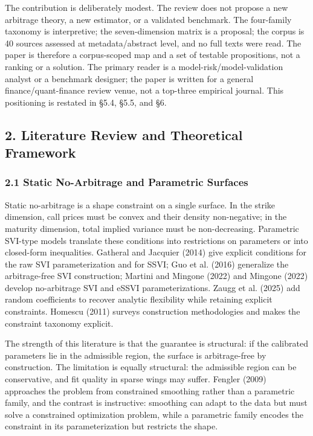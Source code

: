 \documentclass[11pt]{article}
\begin{document}
The contribution is deliberately modest. The review does not propose a new arbitrage theory, a new estimator, or a validated benchmark. The four-family taxonomy is interpretive; the seven-dimension matrix is a proposal; the corpus is 40 sources assessed at metadata/abstract level, and no full texts were read. The paper is therefore a corpus-scoped map and a set of testable propositions, not a ranking or a solution. The primary reader is a model-risk/model-validation analyst or a benchmark designer; the paper is written for a general finance/quant-finance review venue, not a top-three empirical journal. This positioning is restated in \S 5.4, \S 5.5, and \S 6.

\subsection*{2. Literature Review and Theoretical Framework}
\subsubsection*{2.1 Static No-Arbitrage and Parametric Surfaces}
Static no-arbitrage is a shape constraint on a single surface. In the strike dimension, call prices must be convex and their density non-negative; in the maturity dimension, total implied variance must be non-decreasing. Parametric SVI-type models translate these conditions into restrictions on parameters or into closed-form inequalities. Gatheral and Jacquier (2014) give explicit conditions for the raw SVI parameterization and for SSVI; Guo et al. (2016) generalize the arbitrage-free SVI construction; Martini and Mingone (2022) and Mingone (2022) develop no-arbitrage SVI and eSSVI parameterizations. Zaugg et al. (2025) add random coefficients to recover analytic flexibility while retaining explicit constraints. Homescu (2011) surveys construction methodologies and makes the constraint taxonomy explicit.

The strength of this literature is that the guarantee is structural: if the calibrated parameters lie in the admissible region, the surface is arbitrage-free by construction. The limitation is equally structural: the admissible region can be conservative, and fit quality in sparse wings may suffer. Fengler (2009) approaches the problem from constrained smoothing rather than a parametric family, and the contrast is instructive: smoothing can adapt to the data but must solve a constrained optimization problem, while a parametric family encodes the constraint in its parameterization but restricts the shape.
\end{document}
